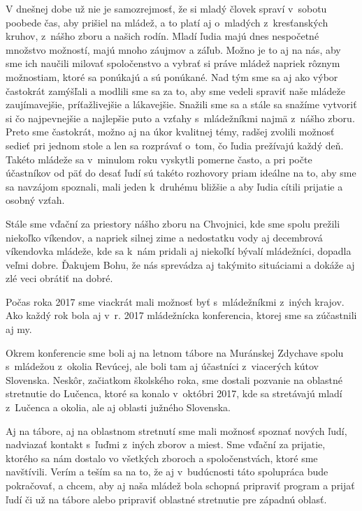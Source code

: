 V dnešnej dobe už nie je samozrejmosť, že si mladý človek spraví v~sobotu poobede čas, aby prišiel na mládež, a to platí aj o~mladých z~kresťanských kruhov, z~nášho zboru a našich rodín. Mladí ľudia majú dnes nespočetné množstvo možností, majú mnoho záujmov a záľub. Možno je to aj na nás, aby sme ich naučili milovať spoločenstvo a vybrať si práve mládež napriek rôznym možnostiam, ktoré sa ponúkajú a sú ponúkané. Nad tým sme sa aj ako výbor častokrát zamýšľali a modlili sme sa za to, aby sme vedeli spraviť naše mládeže zaujímavejšie, príťažlivejšie a lákavejšie. Snažili sme sa a stále sa snažíme vytvoriť si čo najpevnejšie a najlepšie puto a vzťahy s~mládežníkmi najmä z~nášho zboru. Preto sme častokrát, možno aj na úkor kvalitnej témy, radšej zvolili možnosť sedieť pri jednom stole a len sa rozprávať o~tom, čo ľudia prežívajú každý deň. Takéto mládeže sa v~minulom roku vyskytli pomerne často, a pri počte účastníkov od päť do desať ľudí sú takéto rozhovory priam ideálne na to, aby sme sa navzájom spoznali, mali jeden k~druhému bližšie a aby ľudia cítili prijatie a osobný vzťah.

Stále sme vďační za priestory nášho zboru na Chvojnici, kde sme spolu prežili niekoľko víkendov, a napriek silnej zime a nedostatku vody aj decembrová víkendovka mládeže, kde sa k~nám pridali aj niekoľkí bývalí mládežníci, dopadla veľmi dobre. Ďakujem Bohu, že nás sprevádza aj takýmito situáciami a dokáže aj zlé veci obrátiť na dobré.

Počas roka 2017 sme viackrát mali možnosť byť s~mládežníkmi z~iných krajov. Ako každý rok bola aj v~r. 2017 mládežnícka konferencia, ktorej sme sa zúčastnili aj my.

Okrem konferencie sme boli aj na letnom tábore na Muránskej Zdychave spolu s~mládežou z~okolia Revúcej, ale boli tam aj účastníci z~viacerých kútov Slovenska.
Neskôr, začiatkom školského roka, sme dostali pozvanie na oblastné stretnutie do Lučenca, ktoré sa konalo v~októbri 2017, kde sa stretávajú mladí z~Lučenca a okolia, ale aj oblasti južného Slovenska.

Aj na tábore, aj na oblastnom stretnutí sme mali možnosť spoznať nových ľudí, nadviazať kontakt s~ľuďmi z~iných zborov a miest. Sme vďační za prijatie, ktorého sa nám dostalo vo všetkých zboroch a spoločenstvách, ktoré sme navštívili. Verím a teším sa na to, že aj v~budúcnosti táto spolupráca bude pokračovať, a chcem, aby aj naša mládež bola schopná pripraviť program a prijať ľudí či už na tábore alebo pripraviť oblastné stretnutie pre západnú oblasť.

